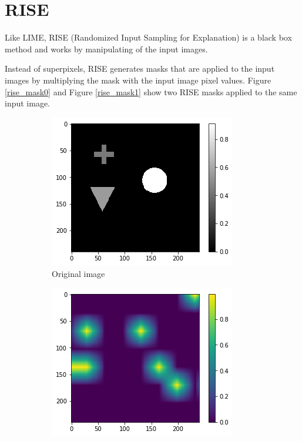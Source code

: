 \section{RISE}

Like LIME, RISE \cite{Petsiuk2018rise} (Randomized Input Sampling for Explanation) is a black box method and works by manipulating of the input images.

Instead of superpixels, RISE generates masks that are applied to the input images by multiplying the mask with the input image pixel values. Figure \ref{rise_mask0} and Figure \ref{rise_mask1} show two RISE masks applied to the same input image.

\begin{figure}[H]
    \centering
    \begin{subfigure}[t]{.32\textwidth}
        \centering
        \includegraphics[width=\linewidth]{chapters/02_methods/images/rise/rise_original.png}
        \caption{Original image}
    \end{subfigure}\hfill%
    \begin{subfigure}[t]{.32\textwidth}
        \centering
        \includegraphics[width=\linewidth]{chapters/02_methods/images/rise/rise0_mask.png}

\end{subfigure}
\end{figure}
